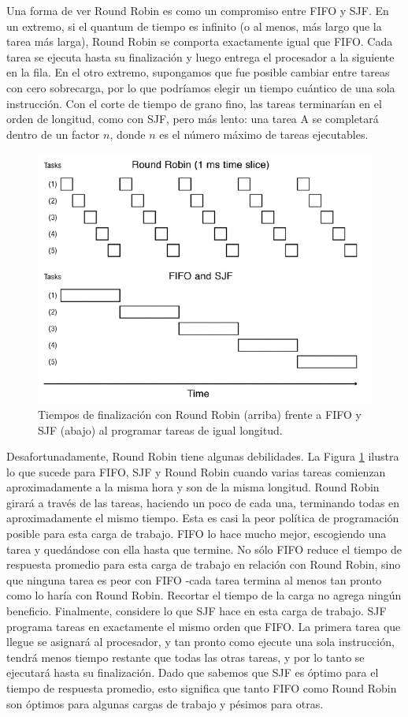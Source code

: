 \documentclass[10pt]{book}
\begin{document}
Una forma de ver Round Robin es como un compromiso entre FIFO y SJF. En un extremo, si el quantum de tiempo es infinito (o al menos, más largo que la tarea más larga), Round Robin se comporta exactamente igual que FIFO. Cada tarea se ejecuta hasta su finalización y luego entrega el procesador a la siguiente en la fila. En el otro extremo, supongamos que fue posible cambiar entre tareas con cero sobrecarga, por lo que podríamos elegir un tiempo cuántico de una sola instrucción. Con el corte de tiempo de grano fino, las tareas terminarían en el orden de longitud, como con SJF, pero más lento: una tarea A se completará dentro de un factor $n$, donde $n$ es el número máximo de tareas ejecutables.

\begin{figure}[tbhp]
\centerline{\includegraphics[scale=0.70]{img/fig0703}}
\caption{Tiempos de finalización con Round Robin (arriba) frente a FIFO y SJF (abajo) al programar tareas de igual longitud.}
\label{fig0703}
\end{figure}

Desafortunadamente, Round Robin tiene algunas debilidades. La Figura \ref{fig0703} ilustra lo que sucede para FIFO, SJF y Round Robin cuando varias tareas comienzan aproximadamente a la misma hora y son de la misma longitud. Round Robin girará a través de las tareas, haciendo un poco de cada una, terminando todas en aproximadamente el mismo tiempo. Esta es casi la peor política de programación posible para esta carga de trabajo. FIFO lo hace mucho mejor, escogiendo una tarea y quedándose con ella hasta que termine. No sólo FIFO reduce el tiempo de respuesta promedio para esta carga de trabajo en relación con Round Robin, sino que ninguna tarea es peor con FIFO -cada tarea termina al menos tan pronto como lo haría con Round Robin. Recortar el tiempo de la carga no agrega ningún beneficio. Finalmente, considere lo que SJF hace en esta carga de trabajo. SJF programa tareas en exactamente el mismo orden que FIFO. La primera tarea que llegue se asignará al procesador, y tan pronto como ejecute una sola instrucción, tendrá menos tiempo restante que todas las otras tareas, y por lo tanto se ejecutará hasta su finalización. Dado que sabemos que SJF es óptimo para el tiempo de respuesta promedio, esto significa que tanto FIFO como Round Robin son óptimos para algunas cargas de trabajo y pésimos para otras.
\end{document}
